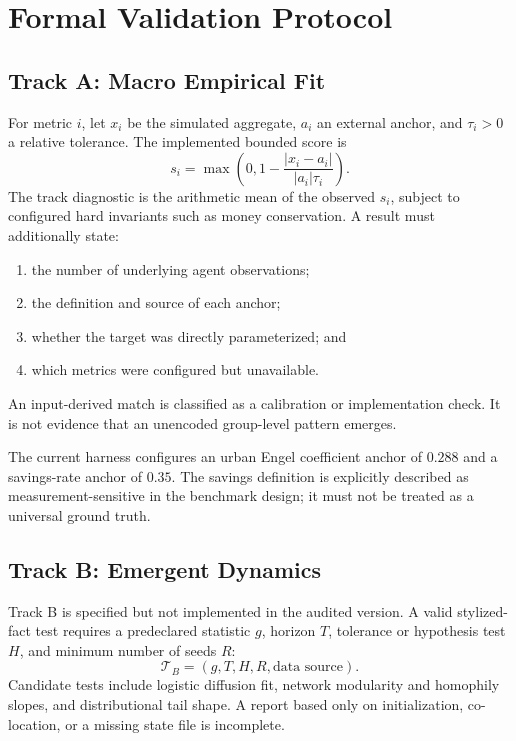 \documentclass[letterpaper]{article}
\begin{document}
\section{Formal Validation Protocol}

\subsection{Track A: Macro Empirical Fit}

For metric $i$, let $x_i$ be the simulated aggregate, $a_i$ an external anchor, and $\tau_i>0$ a relative
tolerance. The implemented bounded score is
\begin{equation}
s_i=\max\left(0,1-\frac{|x_i-a_i|}{|a_i|\tau_i}\right).
\end{equation}
The track diagnostic is the arithmetic mean of the observed $s_i$, subject to configured hard invariants
such as money conservation. A result must additionally state:
\begin{enumerate}
    \item the number of underlying agent observations;
    \item the definition and source of each anchor;
    \item whether the target was directly parameterized; and
    \item which metrics were configured but unavailable.
\end{enumerate}
An input-derived match is classified as a calibration or implementation check. It is not evidence that an
unencoded group-level pattern emerges.

The current harness configures an urban Engel coefficient anchor of $0.288$ and a savings-rate anchor of
$0.35$. The savings definition is explicitly described as measurement-sensitive in the benchmark design;
it must not be treated as a universal ground truth.

\subsection{Track B: Emergent Dynamics}

Track B is specified but not implemented in the audited version. A valid stylized-fact test requires a
predeclared statistic $g$, horizon $T$, tolerance or hypothesis test $H$, and minimum number of seeds $R$:
\begin{equation}
\mathcal{T}_{B}=(g,T,H,R,\text{data source}).
\end{equation}
Candidate tests include logistic diffusion fit, network modularity and homophily slopes, and distributional
tail shape. A report based only on initialization, co-location, or a missing state file is incomplete.
\end{document}
